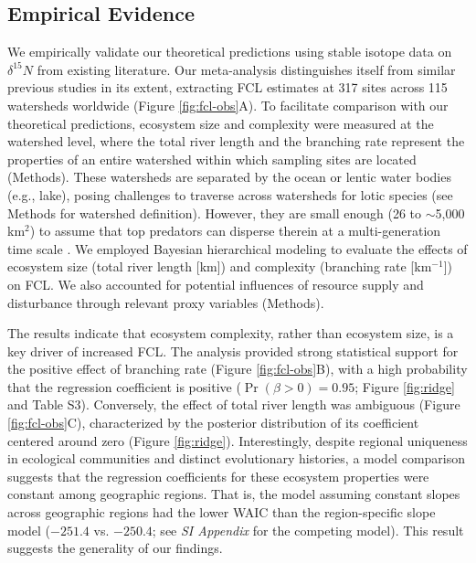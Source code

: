 \documentclass[11pt, class=article, crop=false]{standalone}
\begin{document}
\subsection{Empirical Evidence}

We empirically validate our theoretical predictions using stable isotope data on $\delta^{15}N$ from existing literature.
Our meta-analysis distinguishes itself from similar previous studies in its extent, extracting FCL estimates at 317 sites across 115 watersheds worldwide (Figure \ref{fig:fcl-obs}A).
To facilitate comparison with our theoretical predictions, ecosystem size and complexity were measured at the watershed level, where the total river length and the branching rate represent the properties of an entire watershed within which sampling sites are located (Methods).
These watersheds are separated by the ocean or lentic water bodies (e.g., lake), posing challenges to traverse across watersheds for lotic species (see Methods for watershed definition).
However, they are small enough (26 to $\sim$5,000 km$^2$) to assume that top predators can disperse therein at a multi-generation time scale \citep{comte_fish_2018}.
We employed Bayesian hierarchical modeling to evaluate the effects of ecosystem size (total river length [km]) and complexity (branching rate [km$^{-1}$]) on FCL.
We also accounted for potential influences of resource supply and disturbance through relevant proxy variables (Methods).

The results indicate that ecosystem complexity, rather than ecosystem size, is a key driver of increased FCL.
The analysis provided strong statistical support for the positive effect of branching rate (Figure \ref{fig:fcl-obs}B), with a high probability that the regression coefficient is positive ($\Pr(\beta > 0) = 0.95$; Figure \ref{fig:ridge} and Table S3).
Conversely, the effect of total river length was ambiguous (Figure \ref{fig:fcl-obs}C), characterized by the posterior distribution of its coefficient centered around zero (Figure \ref{fig:ridge}).
Interestingly, despite regional uniqueness in ecological communities and distinct evolutionary histories, a model comparison suggests that the regression coefficients for these ecosystem properties were constant among geographic regions.
That is, the model assuming constant slopes across geographic regions had the lower WAIC \citep{watanabe_asymptotic_2010} than the region-specific slope model ($-251.4$ vs. $-250.4$; see \textit{SI Appendix} for the competing model).
This result suggests the generality of our findings. 
\end{document}
